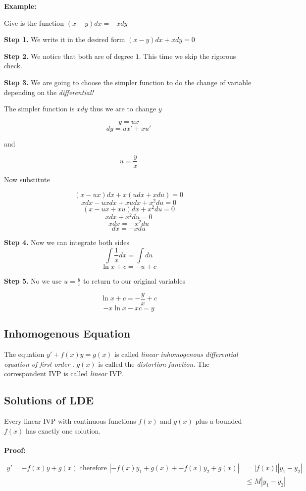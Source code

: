 \textbf{Example:}

Give is the function \((x -y)dx = - xdy\)

\textbf{Step 1.} We write it in the desired form \((x - y)dx + xdy = 0\)

\textbf{Step 2.} We notice that both are of degree \(1\). This time we skip the rigorous check.

\textbf{Step 3.} We are going to choose the simpler function to do the change of variable 
depending on the \emph{differential!} 

The simpler function is \(xdy\) thus we are to change \(y\)

\[y = ux\]
\[dy = ux' + xu'\]

and 

\[u = \frac{y}{x}\]

Now substitute

\[(x - ux)dx + x(udx + xdu) = 0\]
\[xdx - uxdx + xudx + x^{2}du = 0\]
\[(x - ux + xu)dx + x^{2}du = 0\]
\[xdx + x^{2}du = 0\]
\[xdx = - x^{2}du\]
\[dx = - xdu\]

\textbf{Step 4.} Now we can integrate both sides
\[\int \frac{1}{x}dx = \int du\]
\[\ln x + c = -u + c\]

\textbf{Step 5.} No we use \(u = \frac{y}{x}\) to return to our original variables

\[\ln x + c = -\frac{y}{x} + c\]
\[-x\ln x - xc = y\]

\subsection{Inhomogenous Equation}

The equation \(y' + f(x)y = g(x)\) is called \emph{linear inhomogenous differential equation of first order}
. \(g(x)\) is called the \emph{distortion function}. The correspondent IVP is called
\emph{linear} IVP.

\subsection{Solutions of LDE}

Every linear IVP with continuous functions \(f(x)\) and \(g(x)\) plus a bounded \(f(x)\) 
has exactly one solution.
\\\\
\textbf{Proof:}

\begin{align*}
y' = -f(x)y + g(x) \text{ therefore } |-f(x)y_1 + g(x) + -f(x)y_2 + g(x) | &= |f(x)||y_1 - y_2|\\
                                                                        &\le M |y_1 - y_2|
\end{align*}

